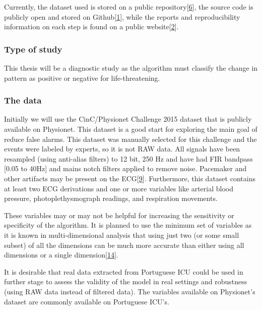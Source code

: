 \documentclass[runningheads]{llncs}
\begin{document}
Currently, the dataset used is stored on a public
repository{[}\protect\hyperlink{ref-franz_dataset}{6}{]}, the source
code is publicly open and stored on
Github{[}\protect\hyperlink{ref-franz_github}{1}{]}, while the reports
and reproducibility information on each step is found on a public
website{[}\protect\hyperlink{ref-franz_website}{2}{]}.

\hypertarget{type-of-study}{%
\subsubsection{Type of study}\label{type-of-study}}

This thesis will be a diagnostic study as the algorithm must classify
the change in pattern as positive or negative for life-threatening.

\hypertarget{the-data}{%
\subsubsection{The data}\label{the-data}}

Initially we will use the CinC/Physionet Challenge 2015 dataset that is
publicly available on Physionet. This dataset is a good start for
exploring the main goal of reduce false alarms. This dataset was
manually selected for this challenge and the events were labeled by
experts, so it is not RAW data. All signals have been resampled (using
anti-alias filters) to 12 bit, 250 Hz and have had FIR bandpass {[}0.05
to 40Hz{]} and mains notch filters applied to remove noise. Pacemaker
and other artifacts may be present on the
ECG{[}\protect\hyperlink{ref-Clifford2015}{9}{]}. Furthermore, this
dataset contains at least two ECG derivations and one or more variables
like arterial blood pressure, photoplethysmograph readings, and
respiration movements.

These variables may or may not be helpful for increasing the sensitivity
or specificity of the algorithm. It is planned to use the minimum set of
variables as it is known in multi-dimensional analysis that using just
two (or some small subset) of all the dimensions can be much more
accurate than either using all dimensions or a single
dimension{[}\protect\hyperlink{ref-gharghabi2018}{14}{]}.

It is desirable that real data extracted from Portuguese ICU could be
used in further stage to assess the validity of the model in real
settings and robustness (using RAW data instead of filtered data). The
variables available on Physionet's dataset are commonly available on
Portuguese ICU's.
\end{document}
